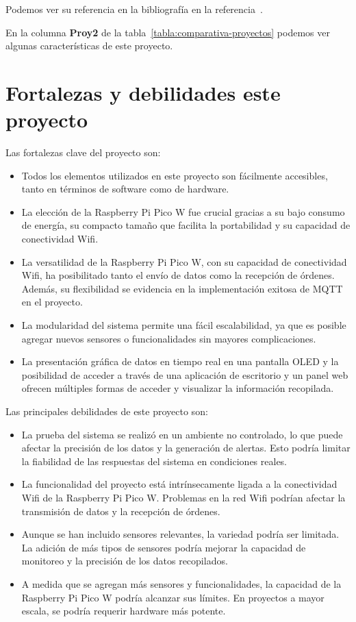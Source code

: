 Podemos ver su referencia en la bibliografía en la referencia~\cite{TesisSantos2017}.

En la columna \textbf{Proy2} de la tabla~\ref{tabla:comparativa-proyectos} podemos ver algunas características de este proyecto.

\section{Fortalezas y debilidades este proyecto}

Las fortalezas clave del proyecto son:

\begin{itemize}
	\item Todos los elementos utilizados en este proyecto son fácilmente accesibles, tanto en términos de software como de hardware.
	\item La elección de la Raspberry Pi Pico W fue crucial gracias a su bajo consumo de energía, su compacto tamaño que facilita la portabilidad y su capacidad de conectividad Wifi.
	\item La versatilidad de la Raspberry Pi Pico W, con su capacidad de conectividad Wifi, ha posibilitado tanto el envío de datos como la recepción de órdenes. Además, su flexibilidad se evidencia en la implementación exitosa de MQTT en el proyecto.
	\item La modularidad del sistema permite una fácil escalabilidad, ya que es posible agregar nuevos sensores o funcionalidades sin mayores complicaciones.		
	\item La presentación gráfica de datos en tiempo real en una pantalla OLED y la posibilidad de acceder a través de una aplicación de escritorio y un panel web ofrecen múltiples formas de acceder y visualizar la información recopilada.
\end{itemize}

Las principales debilidades de este proyecto son:

\begin{itemize}
	\item La prueba del sistema se realizó en un ambiente no controlado, lo que puede afectar la precisión de los datos y la generación de alertas. Esto podría limitar la fiabilidad de las respuestas del sistema en condiciones reales.
	\item La funcionalidad del proyecto está intrínsecamente ligada a la conectividad Wifi de la Raspberry Pi Pico W. Problemas en la red Wifi podrían afectar la transmisión de datos y la recepción de órdenes.
	\item Aunque se han incluido sensores relevantes, la variedad podría ser limitada. La adición de más tipos de sensores podría mejorar la capacidad de monitoreo y la precisión de los datos recopilados.
	\item A medida que se agregan más sensores y funcionalidades, la capacidad de la Raspberry Pi Pico W podría alcanzar sus límites. En proyectos a mayor escala, se podría requerir hardware más potente.
\end{itemize}

